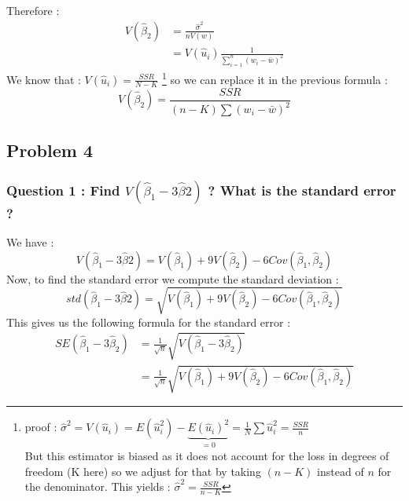 \documentclass{article}
\begin{document}
Therefore : 
\begin{equation}
\begin{aligned}
    V(\hat{\beta}_2) &= \frac{\hat{\sigma}^2}{nV(w)}   \\
    &= V(\hat{u}_i)\frac{1}{\sum_{i=1}^n(w_i-\bar{w})^2}
\end{aligned}
\end{equation}
We know that : $V(\hat{u}_i) = \frac{SSR}{N-K}$ \footnote[3]{proof : $\hat{\sigma}^2=V(\hat{u}_i) = E(\hat{u}_i^2) - \underbrace{E(\hat{u}_i)^2}_{=0} = \frac{1}{N}\sum \hat{u}_i^2 = \frac{SSR}{n}$\\
But this estimator is biased as it does not account for the loss in degrees of freedom (K here) so we adjust for that by taking $(n-K)$ instead of $n$ for the denominator. This yields : $\hat{\sigma}^2=\frac{SSR}{n-K}$} 
so we can replace it in the previous formula : 
\begin{equation}
    V(\hat{\beta}_2) = \frac{SSR}{(n-K)\sum(w_i-\bar{w})^2}
\end{equation}

\subsection{Problem 4}
\subsubsection{Question 1 : Find $V(\hat{\beta}_1-3\hat{\beta}2)$ ? What is the standard error ? }
We have : 
\begin{equation}
    V(\hat{\beta}_1-3\hat{\beta}2) = V(\hat{\beta}_1) + 9V(\hat{\beta}_2)- 6Cov(\hat{\beta}_1,\hat{\beta}_2)
\end{equation}
Now, to find the standard error we compute the standard deviation : 
\begin{equation}
    std(\hat{\beta}_1-3\hat{\beta}2) = \sqrt{V(\hat{\beta}_1) + 9V(\hat{\beta}_2)- 6Cov(\hat{\beta}_1,\hat{\beta}_2)}
\end{equation}
This gives us the following formula for the standard error :
\begin{equation}
\begin{aligned}
    SE(\hat{\beta}_1 - 3\hat{\beta}_2) &= \frac{1}{\sqrt{n}}\sqrt{V\left(\hat{\beta}_1 - 3\hat{\beta}_2\right)} \\
    &= \frac{1}{\sqrt{n}}\sqrt{V(\hat{\beta}_1) + 9V(\hat{\beta}_2) - 6Cov(\hat{\beta}_1, \hat{\beta}_2)}
\end{aligned}
\end{equation}
\end{document}
